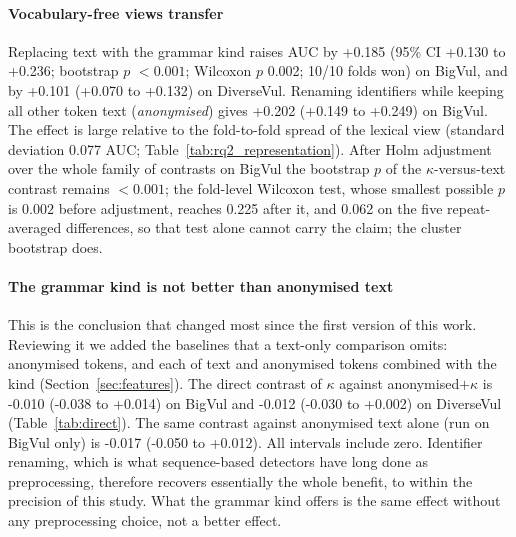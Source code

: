 \documentclass[pdflatex,sn-basic]{sn-jnl}
\theoremstyle{thmstyleone}%
\newcommand{\cBvGgnnAnonVLexD}{+0.202}
\newcommand{\cBvGgnnAnonVLexHi}{+0.249}
\newcommand{\cBvGgnnAnonVLexLo}{+0.149}
\newcommand{\cBvGgnnKindVAnonD}{-0.017}
\newcommand{\cBvGgnnKindVAnonHi}{+0.012}
\newcommand{\cBvGgnnKindVAnonKindD}{-0.010}
\newcommand{\cBvGgnnKindVAnonKindHi}{+0.014}
\newcommand{\cBvGgnnKindVAnonKindLo}{-0.038}
\newcommand{\cBvGgnnKindVAnonLo}{-0.050}
\newcommand{\cBvGgnnKindVLexD}{+0.185}
\newcommand{\cBvGgnnKindVLexH}{$<0.001$}
\newcommand{\cBvGgnnKindVLexHi}{+0.236}
\newcommand{\cBvGgnnKindVLexLo}{+0.130}
\newcommand{\cBvGgnnKindVLexP}{$<0.001$}
\newcommand{\cBvGgnnKindVLexW}{0.002}
\newcommand{\cBvGgnnKindVLexWH}{0.225}
\newcommand{\cBvGgnnKindVLexWblk}{0.062}
\newcommand{\cBvGgnnKindVLexWins}{10/10}
\newcommand{\cDvGgnnKindVAnonKindD}{-0.012}
\newcommand{\cDvGgnnKindVAnonKindHi}{+0.002}
\newcommand{\cDvGgnnKindVAnonKindLo}{-0.030}
\newcommand{\cDvGgnnKindVLexD}{+0.101}
\newcommand{\cDvGgnnKindVLexHi}{+0.132}
\newcommand{\cDvGgnnKindVLexLo}{+0.070}
\newcommand{\numbvGgnnLexicalAucStd}{0.077}
\begin{document}
\paragraph{Vocabulary-free views transfer} Replacing text with the grammar kind
raises AUC by \cBvGgnnKindVLexD{} (95\% CI \cBvGgnnKindVLexLo{} to
\cBvGgnnKindVLexHi{}; bootstrap $p$ \cBvGgnnKindVLexP{}; Wilcoxon $p$
\cBvGgnnKindVLexW{}; \cBvGgnnKindVLexWins{} folds won) on BigVul, and by
\cDvGgnnKindVLexD{} (\cDvGgnnKindVLexLo{} to \cDvGgnnKindVLexHi{}) on
DiverseVul. Renaming identifiers while keeping all other token text
(\emph{anonymised}) gives \cBvGgnnAnonVLexD{}
(\cBvGgnnAnonVLexLo{} to \cBvGgnnAnonVLexHi{}) on BigVul. The effect is large
relative to the fold-to-fold spread of the lexical view
(standard deviation \numbvGgnnLexicalAucStd{} AUC; Table~\ref{tab:rq2_representation}).
After Holm adjustment over the whole family of contrasts on BigVul the
bootstrap $p$ of the $\kappa$-versus-text contrast remains
\cBvGgnnKindVLexH{}; the fold-level Wilcoxon test, whose smallest possible $p$
is $0.002$ before adjustment, reaches \cBvGgnnKindVLexWH{} after it, and
\cBvGgnnKindVLexWblk{} on the five repeat-averaged differences, so that test
alone cannot carry the claim; the cluster bootstrap does.

\paragraph{The grammar kind is not better than anonymised text} This is the
conclusion that changed most since the first version of this work. Reviewing it
we added the baselines that a text-only comparison omits: anonymised tokens, and
each of text and anonymised tokens combined with the kind
(Section~\ref{sec:features}). The direct contrast of $\kappa$ against
anonymised$+\kappa$ is \cBvGgnnKindVAnonKindD{}
(\cBvGgnnKindVAnonKindLo{} to \cBvGgnnKindVAnonKindHi{}) on BigVul and
\cDvGgnnKindVAnonKindD{} (\cDvGgnnKindVAnonKindLo{} to
\cDvGgnnKindVAnonKindHi{}) on DiverseVul
(Table~\ref{tab:direct}). The same contrast against anonymised text alone (run on BigVul only) is
\cBvGgnnKindVAnonD{} (\cBvGgnnKindVAnonLo{} to \cBvGgnnKindVAnonHi{}). All
intervals include zero. Identifier renaming, which is what sequence-based
detectors have long done as preprocessing, therefore recovers essentially the
whole benefit, to within the precision of this study. What the grammar kind offers is the same effect without any
preprocessing choice, not a better effect.
\end{document}
